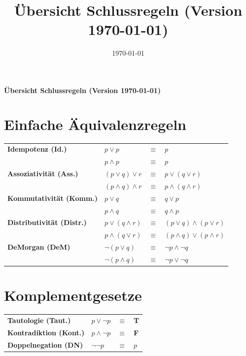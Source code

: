 \documentclass[10.5pt,oneside,a4paper]{paper}
\author{\normalsize }
\title{\large Übersicht Schlussregeln (Version \today)}
\date{\today}
\newcommand{\alert}[1]{\textbf{#1}}
\begin{document}
\thispagestyle{empty}
\noindent \textbf{\sffamily\large Übersicht Schlussregeln (Version \today)}\\

\section{Einfache Äquivalenzregeln}

    \begin{tabular}[h]{p{}p{}cl}
       \alert{Idempotenz (Id.)}         & $p\vee p$ & $\equiv$ & $ p$                                      \\
                                        & $p\wedge p$ & $\equiv$ & $ p$                                    \\
       \alert{Assoziativität (Ass.)}    & $(p\vee q)\vee r $ & $\equiv$ & $ p\vee (q\vee r)$               \\
                                        & $(p\wedge q)\wedge r $ & $\equiv$ & $ p\wedge (q\wedge r)$       \\
       \alert{Kommutativität (Komm.)}   & $p\vee q $ & $\equiv$ & $ q\vee p$                               \\
                                        & $p\wedge q $ & $\equiv$ & $ q\wedge p$                           \\
       \alert{Distributivität (Distr.)} & $p\vee(q\wedge r) $ & $\equiv$ & $ (p\vee q)\wedge(p\vee r)$     \\
                                        & $p\wedge(q\vee r) $ & $\equiv$ & $ (p\wedge q)\vee(p\wedge r)$   \\
       \alert{DeMorgan (DeM)}           & $\neg(p\vee q)$ & $\equiv$ & $\neg p\wedge\neg q$                \\
                                        & $\neg(p\wedge q)$ & $\equiv$ & $\neg p\vee\neg q$                \\
    \end{tabular}

    \vspace{-0.5\baselineskip}

\section{Komplementgesetze}
 
  \begin{tabular}[h]{p{}p{}cl}
       \alert{Tautologie (Taut.)}       & $p\vee\neg p$ & $\equiv$ & \textbf{T}   \\
       \alert{Kontradiktion (Kont.)}    & $p\wedge\neg p$ & $\equiv$ & \textbf{F} \\
       \alert{Doppelnegation (DN)}      & $\neg\neg p$ & $\equiv$ & $ p$            \\
    \end{tabular}
\end{document}

